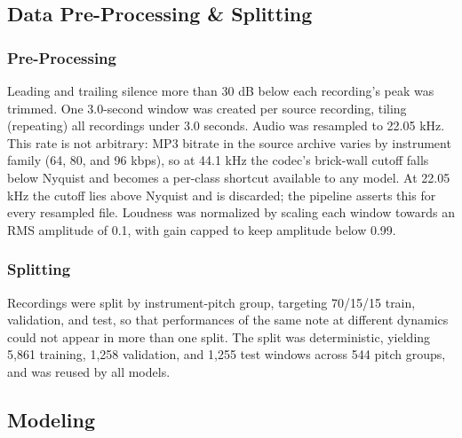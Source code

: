 \documentclass[conference]{IEEEtran}
\begin{document}
\subsection{Data Pre-Processing \& Splitting}
\subsubsection{Pre-Processing}
Leading and trailing silence more than 30 dB below each recording's peak was trimmed. One 3.0-second window was created per source recording, tiling (repeating) all recordings under 3.0 seconds. Audio was resampled to 22.05 kHz. This rate is not arbitrary: MP3 bitrate in the source archive varies by instrument family (64, 80, and 96 kbps), so at 44.1 kHz the codec's brick-wall cutoff falls below Nyquist and becomes a per-class shortcut available to any model. At 22.05 kHz the cutoff lies above Nyquist and is discarded; the pipeline asserts this for every resampled file. Loudness was normalized by scaling each window towards an RMS amplitude of 0.1, with gain capped to keep amplitude below 0.99.
\subsubsection{Splitting}
Recordings were split by instrument-pitch group, targeting 70/15/15 train, validation, and test, so that performances of the same note at different dynamics could not appear in more than one split. The split was deterministic, yielding 5,861 training, 1,258 validation, and 1,255 test windows across 544 pitch groups, and was reused by all models.

\subsection{Modeling}
\end{document}
